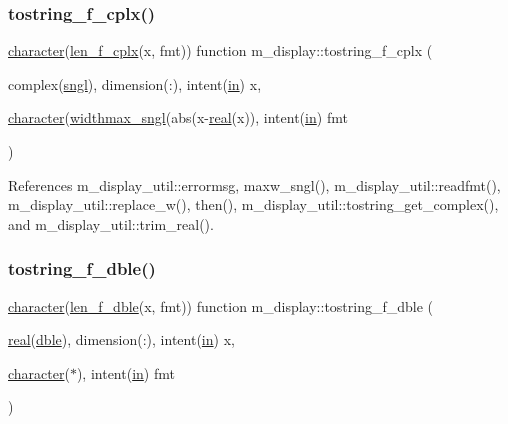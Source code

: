 \subsubsection{\texorpdfstring{tostring\+\_\+f\+\_\+cplx()}{tostring\_f\_cplx()}}
{\footnotesize\ttfamily \hyperlink{option__stopwatch_83_8txt_abd4b21fbbd175834027b5224bfe97e66}{character}(\hyperlink{namespacem__display_a37f268a7276f14d4975200a8f83acff3}{len\+\_\+f\+\_\+cplx}(x, fmt)) function m\+\_\+display\+::tostring\+\_\+f\+\_\+cplx (\begin{DoxyParamCaption}\item[{complex(\hyperlink{namespacem__display_a2ac86bc535c3ccc5947dbb3109c666b5}{sngl}), dimension(\+:), intent(\hyperlink{M__journal_83_8txt_afce72651d1eed785a2132bee863b2f38}{in})}]{x,  }\item[{\hyperlink{option__stopwatch_83_8txt_abd4b21fbbd175834027b5224bfe97e66}{character}(\hyperlink{namespacem__display_a3bb36db16c84ea38d1697191adbc027a}{widthmax\+\_\+sngl}(abs(x-\/\hyperlink{read__watch_83_8txt_abdb62bde002f38ef75f810d3a905a823}{real}(x)), intent(\hyperlink{M__journal_83_8txt_afce72651d1eed785a2132bee863b2f38}{in})}]{fmt }\end{DoxyParamCaption})\hspace{0.3cm}{\ttfamily [private]}}



References m\+\_\+display\+\_\+util\+::errormsg, maxw\+\_\+sngl(), m\+\_\+display\+\_\+util\+::readfmt(), m\+\_\+display\+\_\+util\+::replace\+\_\+w(), then(), m\+\_\+display\+\_\+util\+::tostring\+\_\+get\+\_\+complex(), and m\+\_\+display\+\_\+util\+::trim\+\_\+real().

\mbox{\label{namespacem__display_af82ac5edf2d812767205ea93974885d6}} 
\subsubsection{\texorpdfstring{tostring\+\_\+f\+\_\+dble()}{tostring\_f\_dble()}}
{\footnotesize\ttfamily \hyperlink{option__stopwatch_83_8txt_abd4b21fbbd175834027b5224bfe97e66}{character}(\hyperlink{namespacem__display_aa013a639d5b0f7e40b627c9d712693f0}{len\+\_\+f\+\_\+dble}(x, fmt)) function m\+\_\+display\+::tostring\+\_\+f\+\_\+dble (\begin{DoxyParamCaption}\item[{\hyperlink{read__watch_83_8txt_abdb62bde002f38ef75f810d3a905a823}{real}(\hyperlink{namespacem__display_a46d90b75b6ccef7ccade133e5847e815}{dble}), dimension(\+:), intent(\hyperlink{M__journal_83_8txt_afce72651d1eed785a2132bee863b2f38}{in})}]{x,  }\item[{\hyperlink{option__stopwatch_83_8txt_abd4b21fbbd175834027b5224bfe97e66}{character}($\ast$), intent(\hyperlink{M__journal_83_8txt_afce72651d1eed785a2132bee863b2f38}{in})}]{fmt }\end{DoxyParamCaption})\hspace{0.3cm}{\ttfamily [private]}}



